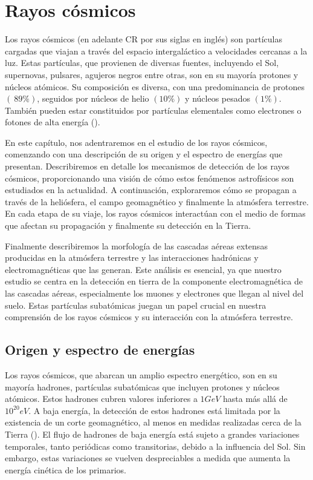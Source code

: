 \newpage
\chapter{Rayos cósmicos}
Los rayos cósmicos (en adelante CR por sus siglas en inglés) son partículas cargadas que viajan a través del espacio intergaláctico a velocidades cercanas a la luz. Estas partículas, que provienen de diversas fuentes, incluyendo el Sol, supernovas, pulsares, agujeros negros entre otras, son en su mayoría protones y núcleos atómicos. Su composición es diversa, con una predominancia de protones $(~89\%)$, seguidos por núcleos de helio $( 10\%)$ y núcleos pesados $( 1\%)$. También pueden estar constituidos por partículas elementales como electrones o fotones de alta energía  (\cite{kampert_2012}).

En este capítulo, nos adentraremos en el estudio de los rayos cósmicos, comenzando con una descripción de su origen y el espectro de energías que presentan. Describiremos en detalle los mecanismos de detección de los rayos cósmicos, proporcionando una visión de cómo estos fenómenos astrofísicos son estudiados en la actualidad.  A continuación, exploraremos cómo se propagan a través de la heliósfera, el campo geomagnético y finalmente la atmósfera terrestre. En cada etapa de su viaje, los rayos cósmicos interactúan con el medio de formas que afectan su propagación y finalmente su detección en la Tierra.

Finalmente describiremos la morfología de las cascadas aéreas extensas producidas en la atmósfera terrestre y las interacciones hadrónicas y electromagnéticas que las generan. Este análisis es esencial, ya que nuestro estudio se centra en la detección en tierra de la componente electromagnética de las cascadas aéreas, especialmente los muones y electrones que llegan al nivel del suelo. Estas partículas subatómicas juegan un papel crucial en nuestra comprensión de los rayos cósmicos y su interacción con la atmósfera terrestre. 

\section{Origen y espectro de energías}

Los rayos cósmicos, que abarcan un amplio espectro energético, son en su mayoría hadrones, partículas subatómicas que incluyen protones y núcleos atómicos. Estos hadrones cubren valores inferiores a $1 GeV$ hasta más allá de $10^{20} eV$.  A baja energía, la detección de estos hadrones está limitada por la existencia de un corte geomagnético, al menos en medidas realizadas cerca de la Tierra (\cite{Riggi_2023}). El flujo de hadrones de baja energía está sujeto a grandes variaciones temporales, tanto periódicas como transitorias, debido a la influencia del Sol. Sin embargo, estas variaciones se vuelven despreciables a medida que aumenta la energía cinética de los primarios.


